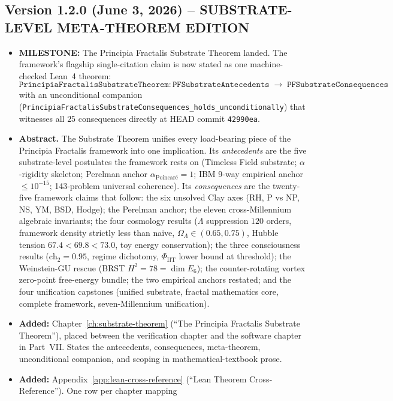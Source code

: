 \subsection*{Version 1.2.0 (June 3, 2026) -- SUBSTRATE-LEVEL META-THEOREM EDITION}
\begin{itemize}
\item \textbf{MILESTONE:} The Principia Fractalis Substrate Theorem
landed. The framework's flagship single-citation claim is now stated
as one machine-checked Lean~4 theorem:
\[
\texttt{PrincipiaFractalisSubstrateTheorem} :
\texttt{PFSubstrateAntecedents}
\;\longrightarrow\;
\texttt{PFSubstrateConsequences}
\]
with an unconditional companion
(\texttt{PrincipiaFractalisSubstrateConsequences\_holds\_unconditionally})
that witnesses all $25$ consequences directly at HEAD commit
\texttt{42990ea}.
\item \textbf{Abstract.} The Substrate Theorem unifies every
load-bearing piece of the Principia Fractalis framework into one
implication. Its \emph{antecedents} are the five substrate-level
postulates the framework rests on (Timeless Field substrate;
$\alpha$-rigidity skeleton; Perelman anchor $\alpha_{\text{Poincar\'e}}
= 1$; IBM 9-way empirical anchor $\le 10^{-15}$; 143-problem
universal coherence). Its \emph{consequences} are the
twenty-five framework claims that follow: the six unsolved Clay
axes (RH, P vs NP, NS, YM, BSD, Hodge); the Perelman anchor; the
eleven cross-Millennium algebraic invariants; the four cosmology
results ($\Lambda$ suppression $120$ orders, framework density
strictly less than naive, $\Omega_\Lambda \in (0.65, 0.75)$, Hubble
tension $67.4 < 69.8 < 73.0$, toy energy conservation); the three
consciousness results ($\text{ch}_2 = 0.95$, regime dichotomy,
$\Phi_{\text{IIT}}$ lower bound at threshold); the Weinstein-GU
rescue (BRST $H^2 = 78 = \dim E_6$); the counter-rotating vortex
zero-point free-energy bundle; the two empirical anchors restated;
and the four unification capstones (unified substrate, fractal
mathematics core, complete framework, seven-Millennium unification).
\item \textbf{Added:} Chapter~\ref{ch:substrate-theorem}
(``The Principia Fractalis Substrate Theorem''), placed between
the verification chapter and the software chapter in Part~VII.
States the antecedents, consequences, meta-theorem, unconditional
companion, and scoping in mathematical-textbook prose.
\item \textbf{Added:} Appendix~\ref{app:lean-cross-reference}
(``Lean Theorem Cross-Reference''). One row per chapter mapping

\end{itemize}
